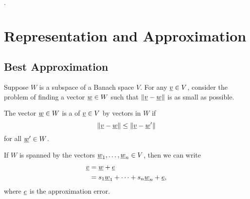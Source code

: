 .\chapter{Representation and Approximation}

\section{Best Approximation}
Suppose $W$ is a subspace of a Banach space $V$.
For any $\underline{v} \in V$, consider the problem of finding a vector $\underline{w} \in W$ such that $\left\| \underline{v} - \underline{w} \right\|$ is as small as possible.
\begin{definition}
The vector $\underline{w} \in W$ is a  of $\underline{v} \in V$ by vectors in $W$ if
\begin{equation*}
\left\| \underline{v} - \underline{w} \right\| \leq \left\| \underline{v} - \underline{w}' \right\|
\end{equation*}
for all $\underline{w}' \in W$.
\end{definition}
\noindent If $W$ is spanned by the vectors $\underline{w}_1, \ldots, \underline{w}_n \in V$, then we can write
\begin{equation*}
\begin{split}
\underline{v} &= \underline{w} + \underline{e} \\
&= s_1 \underline{w}_1 + \cdots + s_n \underline{w}_n + \underline{e},
\end{split}
\end{equation*}
where $\underline{e}$ is the approximation error.

